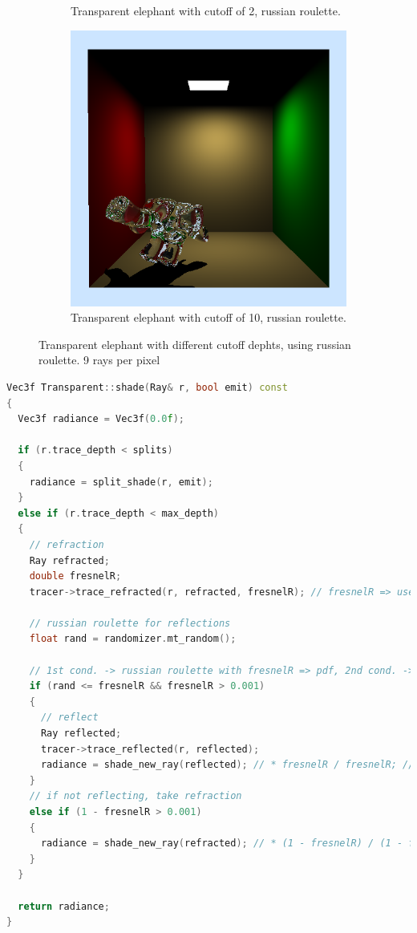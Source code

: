 \begin{figure}[h]
\begin{subfigure}[b]{0.3\textwidth}
		\caption{Transparent elephant with cutoff of 2, russian roulette.}
	\end{subfigure}
	\begin{subfigure}[b]{0.3\textwidth}
		\includegraphics[width=\textwidth]{week3/elephant_10_russ.png}
		\caption{Transparent elephant with cutoff of 10, russian roulette.}
	\end{subfigure}
	
	\caption{Transparent elephant with different cutoff dephts, using russian roulette. 9 rays per pixel}
	\label{fig:transparentelephantsruss}
\end{figure}

\newpage
\begin{lstlisting}[language=C++,caption=Transparent::shade,label=lst:transparent::shade,firstnumber=12]
Vec3f Transparent::shade(Ray& r, bool emit) const
{  
  Vec3f radiance = Vec3f(0.0f);

  if (r.trace_depth < splits)
  {
    radiance = split_shade(r, emit);
  }
  else if (r.trace_depth < max_depth)
  {
    // refraction
    Ray refracted;
    double fresnelR;
    tracer->trace_refracted(r, refracted, fresnelR); // fresnelR => use as step probability

    // russian roulette for reflections
    float rand = randomizer.mt_random();

    // 1st cond. -> russian roulette with fresnelR => pdf, 2nd cond. -> eliminating rays following surface
    if (rand <= fresnelR && fresnelR > 0.001)
    {
      // reflect
      Ray reflected;
      tracer->trace_reflected(r, reflected);
      radiance = shade_new_ray(reflected); // * fresnelR / fresnelR; // divide by fresnelR, since fresnelR is used as the step probability
    }
    // if not reflecting, take refraction
    else if (1 - fresnelR > 0.001)
    {
      radiance = shade_new_ray(refracted); // * (1 - fresnelR) / (1 - fresnelR);
    }
  }

  return radiance;
}
\end{lstlisting}

